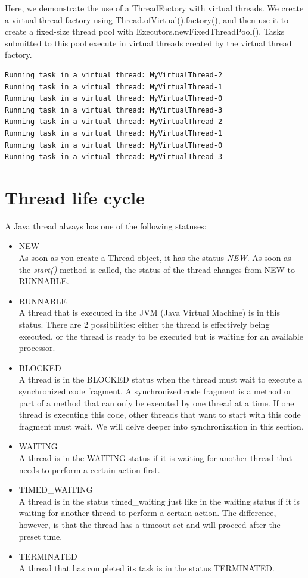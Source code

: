 Here, we demonstrate the use of a ThreadFactory with virtual threads. We create a virtual thread factory using Thread.ofVirtual().factory(), and then use it to create a fixed-size thread pool with Executors.newFixedThreadPool(). Tasks submitted to this pool execute in virtual threads created by the virtual thread factory.

\begin{verbatim}
Running task in a virtual thread: MyVirtualThread-2
Running task in a virtual thread: MyVirtualThread-1
Running task in a virtual thread: MyVirtualThread-0
Running task in a virtual thread: MyVirtualThread-3
Running task in a virtual thread: MyVirtualThread-2
Running task in a virtual thread: MyVirtualThread-1
Running task in a virtual thread: MyVirtualThread-0
Running task in a virtual thread: MyVirtualThread-3
\end{verbatim}

\section{Thread life cycle}

A Java thread always has one of the following statuses:
\begin{itemize}
\item NEW\\
As soon as you create a Thread object, it has the status \textit{NEW}. As soon as the \textit{start()} method is called, the status of the thread changes from NEW to RUNNABLE.
\item RUNNABLE\\
A thread that is executed in the JVM (Java Virtual Machine) is in this status. There are 2 possibilities: either the thread is effectively being executed, or the thread is ready to be executed but is waiting for an available processor.
\item BLOCKED\\
A thread is in the BLOCKED status when the thread must wait to execute a synchronized code fragment. A synchronized code fragment is a method or part of a method that can only be executed by one thread at a time. If one thread is executing this code, other threads that want to start with this code fragment must wait. We will delve deeper into synchronization in this section.
\item WAITING\\
A thread is in the WAITING status if it is waiting for another thread that needs to perform a certain action first.
\item TIMED\_WAITING\\
A thread is in the status timed\_waiting just like in the waiting status if it is waiting for another thread to perform a certain action. The difference, however, is that the thread has a timeout set and will proceed after the preset time.
\item TERMINATED\\
A thread that has completed its task is in the status TERMINATED.
\end{itemize}

